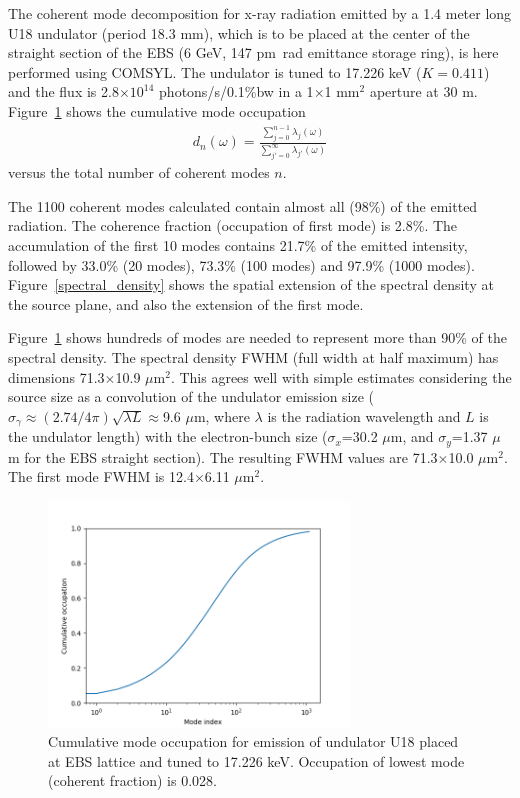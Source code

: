 \documentclass[%
 reprint,
 amsmath,amssymb,
 aps,
]{revtex4-1}
\begin{document}
The coherent mode decomposition for x-ray radiation emitted by a 1.4 meter long U18 undulator (period 18.3 mm), which is to be placed at the center of the straight section of the EBS (6 GeV, 147 pm~rad emittance storage ring), is here performed using COMSYL. The undulator is tuned to 17.226 keV ($K=0.411$) and the flux is 2.8$\times 10^{14}$ photons/s/0.1\%bw in a 1$\times$1 mm$^2$ aperture at 30 m. Figure~\ref{cumulative_mode_occupation} shows the cumulative mode occupation 
\begin{equation}
\begin{aligned}
\label{spectrum}
d_n(\omega)=\frac{\sum_{j=0}^{n-1} \lambda_j(\omega)}{\sum_{j'=0}^{\infty} \lambda_{j'}(\omega)}
\end{aligned}
\end{equation}
versus the total number of coherent modes $n$.

The 1100 coherent modes calculated contain almost all (98\%) of the emitted radiation. The coherence fraction (occupation of first mode) is 2.8\%. The accumulation of the first 10 modes contains 21.7\% of the emitted intensity, followed by 33.0\% (20 modes), 73.3\% (100 modes) and 97.9\% (1000 modes). 
Figure~\ref{spectral_density} shows the spatial extension of the spectral density at the source plane, and also the extension of the first mode.

Figure~\ref{cumulative_mode_occupation} shows hundreds of modes are needed to represent more than 90\% of the spectral density. The spectral density FWHM (full width at half maximum) has dimensions 71.3$\times$10.9 $\mu$m$^2$. This agrees well with simple estimates considering the source size as a convolution of the undulator emission size ($\sigma_\gamma\approx (2.74/4\pi) \sqrt{\lambda L}\approx$9.6 $\mu$m, where  $\lambda$ is the radiation wavelength and $L$ is the undulator length) with the electron-bunch size ($\sigma_x$=30.2 $\mu$m, and $\sigma_y$=1.37 $\mu$m for the EBS straight section). The resulting FWHM values are 71.3$\times$10.0 $\mu$m$^2$. The first mode FWHM is 12.4$\times$6.11 $\mu$m$^2$.  

\begin{figure}
\includegraphics[width=8cm]{Figures/vx_cumulated.png}
\caption{Cumulative mode occupation for  emission of undulator U18 placed at EBS lattice and tuned to 17.226 keV. Occupation of lowest mode (coherent fraction) is 0.028.}
\label{cumulative_mode_occupation}
\end{figure}
\end{document}
